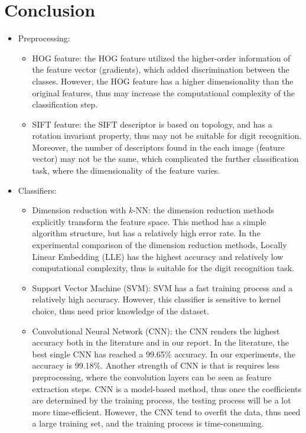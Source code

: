 \documentclass[12pt]{article}
\begin{document}
\section{Conclusion}
\begin{itemize}
	\item Preprocessing:
	\begin{itemize}
		\item HOG feature: the HOG feature utilized the higher-order information of the feature vector (gradients), which added discrimination between the classes. However, the HOG feature has a higher dimensionality than the original features, thus may increase the computational complexity of the classification step.
		\item SIFT feature: the SIFT descriptor is based on topology, and has a rotation invariant property, thus may not be suitable for digit recognition. Moreover, the number of descriptors found in the each image (feature vector) may not be the same, which complicated the further classification task, where the dimensionality of the feature varies.
	\end{itemize}
	\item Classifiers:
	\begin{itemize}
		\item Dimension reduction with $k$-NN: the dimension reduction methods explicitly transform the feature space. This method has a simple algorithm structure, but has a relatively high error rate. In the experimental comparison of the dimension reduction methods, Locally Linear Embedding (LLE) has the highest accuracy and relatively low computational complexity, thus is suitable for the digit recognition task.
		\item Support Vector Machine (SVM): SVM has a fast training process and a relatively high accuracy. However, this classifier is sensitive to kernel choice, thus need prior knowledge of the dataset.
		\item Convolutional Neural Network (CNN): the CNN renders the highest accuracy both in the literature and in our report. In the literature, the best single CNN has reached a 99.65\% accuracy. In our experiments, the accuracy is 99.18\%. Another strength of CNN is that is requires less preprocessing, where the convolution layers can be seen as feature extraction steps. CNN is a model-based method, thus once the coefficients are determined by the training process, the testing process will be a lot more time-efficient. However, the CNN tend to overfit the data, thus need a large training set, and the training process is time-consuming.
	\end{itemize}
\end{itemize}
\end{document}
